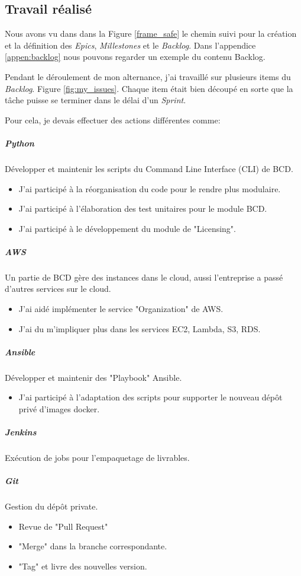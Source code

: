 \subsection{Travail réalisé}
Nous avons vu dans dans la Figure \ref{frame_safe} le chemin suivi pour la création et la définition des \textit{Epics}, \textit{Millestones} et le \textit{Backlog}. Dans l'appendice \ref{appen:backlog} nous pouvons regarder un exemple du contenu Backlog.

Pendant le déroulement de mon alternance, j'ai travaillé sur plusieurs items du \textit{Backlog}. Figure \ref{fig:my_issues}. Chaque item était bien découpé en sorte que la tâche puisse se terminer dans le délai d'un \textit{Sprint}.


Pour cela, je devais effectuer des actions différentes comme:

\subparagraph{Python} Développer et maintenir les scripts du Command Line Interface (CLI) de BCD.
\begin{itemize}
  \item J'ai participé à la réorganisation du code pour le rendre plus modulaire.
  \item J'ai participé à l'élaboration des test unitaires pour le module BCD.
  \item J'ai participé à le développement du module de "Licensing".
\end{itemize}

\subparagraph{AWS} Un partie de BCD gère des instances dans le cloud, aussi l'entreprise a passé d'autres services sur le cloud.
\begin{itemize}
  \item J'ai aidé implémenter le service "Organization" de AWS.
  \item J'ai du m'impliquer plus dans les services EC2, Lambda, S3, RDS.
\end{itemize}

\subparagraph{Ansible} Développer et maintenir des "Playbook" Ansible.
\begin{itemize}
  \item J'ai participé à l'adaptation des scripts pour supporter le nouveau dépôt privé d'images docker.
\end{itemize}

\subparagraph{Jenkins} Exécution de jobs pour l'empaquetage de livrables.

\subparagraph{Git} Gestion du dépôt private.
\begin{itemize}
  \item Revue de "Pull Request"
  \item "Merge" dans la branche correspondante.
  \item "Tag" et livre des nouvelles version.
\end{itemize}

